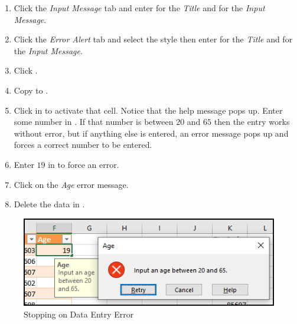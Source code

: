 \begin{enumerate}[resume]	
	\item Click the \textit{Input Message} tab and enter  for the \textit{Title} and  for the \textit{Input Message}.
	\item Click the \textit{Error Alert} tab and select the  style then enter  for the \textit{Title} and  for the \textit{Input Message}.
	\item Click .
	\item Copy  to .
	\item Click in  to activate that cell. Notice that the help message pops up. Enter some number in . If that number is between $ 20 $ and $ 65 $ then the entry works without error, but if anything else is entered, an error message pops up and forces a correct number to be entered.
	\item Enter $ 19 $ in  to force an error.
	\item Click  on the \textit{Age} error message.
	\item Delete the data in .
\end{enumerate}

\begin{figure}[H]
	\centering
	\includegraphics[width=\maxwidth{.75\linewidth}]{gfx/ch07_fig40}
	\caption{Stopping on Data Entry Error}
	\label{07:fig40}
\end{figure}

